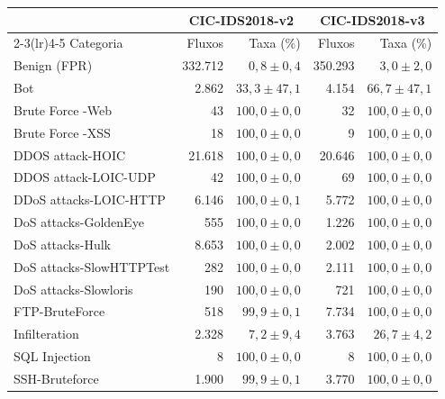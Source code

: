 \begin{tabular}{lrrrr}
\toprule
& \multicolumn{2}{c}{CIC-IDS2018-v2} & \multicolumn{2}{c}{CIC-IDS2018-v3} \\
\cmidrule(lr){2-3}\cmidrule(lr){4-5}
Categoria & Fluxos & Taxa (\%) & Fluxos & Taxa (\%) \\
\midrule
Benign (FPR) & 332.712 & $0,8 \pm 0,4$ & 350.293 & $3,0 \pm 2,0$ \\
\midrule
Bot & 2.862 & $33,3 \pm 47,1$ & 4.154 & $66,7 \pm 47,1$ \\
Brute Force -Web & 43 & $100,0 \pm 0,0$ & 32 & $100,0 \pm 0,0$ \\
Brute Force -XSS & 18 & $100,0 \pm 0,0$ & 9 & $100,0 \pm 0,0$ \\
DDOS attack-HOIC & 21.618 & $100,0 \pm 0,0$ & 20.646 & $100,0 \pm 0,0$ \\
DDOS attack-LOIC-UDP & 42 & $100,0 \pm 0,0$ & 69 & $100,0 \pm 0,0$ \\
DDoS attacks-LOIC-HTTP & 6.146 & $100,0 \pm 0,1$ & 5.772 & $100,0 \pm 0,0$ \\
DoS attacks-GoldenEye & 555 & $100,0 \pm 0,0$ & 1.226 & $100,0 \pm 0,0$ \\
DoS attacks-Hulk & 8.653 & $100,0 \pm 0,0$ & 2.002 & $100,0 \pm 0,0$ \\
DoS attacks-SlowHTTPTest & 282 & $100,0 \pm 0,0$ & 2.111 & $100,0 \pm 0,0$ \\
DoS attacks-Slowloris & 190 & $100,0 \pm 0,0$ & 721 & $100,0 \pm 0,0$ \\
FTP-BruteForce & 518 & $99,9 \pm 0,1$ & 7.734 & $100,0 \pm 0,0$ \\
Infilteration & 2.328 & $7,2 \pm 9,4$ & 3.763 & $26,7 \pm 4,2$ \\
SQL Injection & 8 & $100,0 \pm 0,0$ & 8 & $100,0 \pm 0,0$ \\
SSH-Bruteforce & 1.900 & $99,9 \pm 0,1$ & 3.770 & $100,0 \pm 0,0$ \\
\bottomrule
\end{tabular}
